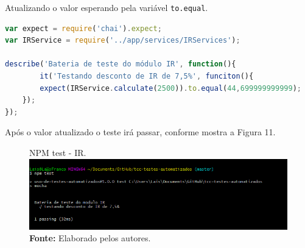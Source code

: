 \par Atualizando o valor esperando pela variável \texttt{to.equal}.



\begin{lstlisting}[language=JavaScript, caption={[Teste IR.]{Teste IR.  \textbf{Fonte:} Elaborado pelos autores.}}]
var expect = require('chai').expect;
var IRService = require('../app/services/IRServices');

describe('Bateria de teste do módulo IR', function(){
        it('Testando desconto de IR de 7,5%', funciton(){
        expect(IRService.calculate(2500)).to.equal(44,699999999999);
    });
});

\end{lstlisting}

\newpage

\par Após o valor atualizado o teste irá passar, conforme mostra a Figura 11.

\begin{figure}[!htb]
     \caption[NPM test - IR ]{NPM test - IR.
     \centering
     \raggedleft
     \includegraphics[scale=.70]{imagens/teste11.png}
    \centering
     \textbf{Fonte: } Elaborado pelos autores.}
     \label{fig:npm test - ir}
\end{figure}


